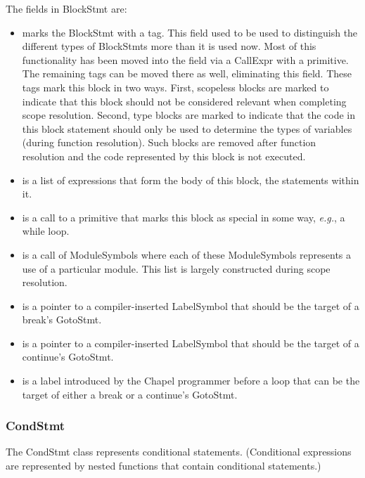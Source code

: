 \documentclass[10pt]{article}
\newcommand{\eg}{\emph{e.g.}}
\begin{document}
The fields in BlockStmt are:
\begin{itemize}
\item {} marks the BlockStmt with a tag.  This
  field used to be used to distinguish the different types of
  BlockStmts more than it is used now.  Most of this functionality has
  been moved into the  field via a CallExpr with a primitive.
  The remaining tags can be moved there as well, eliminating this
  field.  These tags mark this block in two ways.  First, scopeless
  blocks are marked to indicate that this block should not be
  considered relevant when completing scope resolution.  Second, type
  blocks are marked to indicate that the code in this block statement
  should only be used to determine the types of variables (during
  function resolution).  Such blocks are removed after function
  resolution and the code represented by this block is not executed.
\item {} is a list of expressions that form the body of
  this block, the statements within it.
\item {} is a call to a primitive that marks
  this block as special in some way, \eg, a while loop.
\item {} is a call of ModuleSymbols where each of
  these ModuleSymbols represents a use of a particular module.  This
  list is largely constructed during scope resolution.
\item {} is a pointer to a compiler-inserted
  LabelSymbol that should be the target of a break's GotoStmt.
\item {} is a pointer to a
  compiler-inserted LabelSymbol that should be the target of a
  continue's GotoStmt.
\item {} is a label introduced by the Chapel
  programmer before a loop that can be the target of either a break or
  a continue's GotoStmt.
\end{itemize}

\subsubsection{CondStmt}
\label{sec:condstmt}

The CondStmt class represents conditional statements. (Conditional
expressions are represented by nested functions that contain
conditional statements.)
\end{document}
